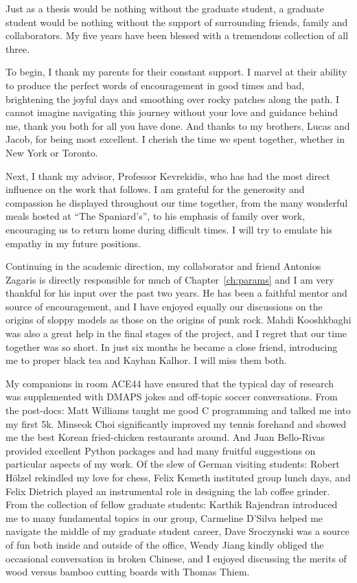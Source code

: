 
Just as a thesis would be nothing without the graduate student, a graduate student would be nothing without the support of surrounding friends, family and collaborators. My five years have been blessed with a tremendous collection of all three.

To begin, I thank my parents for their constant support. I marvel at their ability to produce the perfect words of encouragement in good times and bad, brightening the joyful days and smoothing over rocky patches along the path. I cannot imagine navigating this journey without your love and guidance behind me, thank you both for all you have done. And thanks to my brothers, Lucas and Jacob, for being most excellent. I cherish the time we spent together, whether in New York or Toronto.

Next, I thank my advisor, Professor Kevrekidis, who has had the most direct influence on the work that follows. I am grateful for the generosity and compassion he displayed throughout our time together, from the many wonderful meals hosted at ``The Spaniard's'', to his emphasis of family over work, encouraging us to return home during difficult times. I will try to emulate his empathy in my future positions.

Continuing in the academic direction, my collaborator and friend Antonios Zagaris is directly responsible for much of Chapter~\ref{ch:params} and I am very thankful for his input over the past two years. He has been a faithful mentor and source of encouragement, and I have enjoyed equally our discussions on the origins of sloppy models as those on the origins of punk rock. Mahdi Kooshkbaghi was also a great help in the final stages of the project, and I regret that our time together was so short. In just six months he became a close friend, introducing me to proper black tea and Kayhan Kalhor. I will miss them both.

My companions in room ACE44 have ensured that the typical day of research was supplemented with DMAPS jokes and off-topic soccer conversations. From the post-docs: Matt Williams taught me good C programming and talked me into my first 5k. Minseok Choi significantly improved my tennis forehand and showed me the best Korean fried-chicken restaurants around. And Juan Bello-Rivas provided excellent Python packages and had many fruitful suggestions on particular aspects of my work. Of the slew of German visiting students: Robert H\"{o}lzel rekindled my love for chess, Felix Kemeth instituted group lunch days, and Felix Dietrich played an instrumental role in designing the lab coffee grinder. From the collection of fellow graduate students: Karthik Rajendran introduced me to many fundamental topics in our group, Carmeline D'Silva helped me navigate the middle of my graduate student career, Dave Sroczynski was a source of fun both inside and outside of the office, Wendy Jiang kindly obliged the occasional conversation in broken Chinese, and I enjoyed discussing the merits of wood versus bamboo cutting boards with Thomas Thiem.


